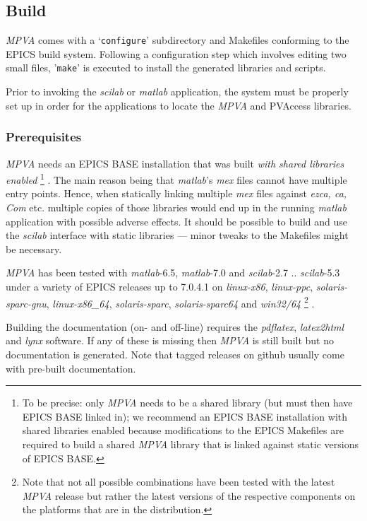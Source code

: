 \documentclass{article}
\newcommand{\sca}{\ita{MPVA}}
\newcommand{\scilab}{\ita{scilab}}
\newcommand{\matlab}{\ita{matlab}}
\newcommand{\windoze}{\ita{win32/64}}
\newcommand{\com}[1]{{\tt #1}}
\newcommand{\ita}[1]{\emph{#1}}
\begin{document}
\subsection{Build}

\sca{} comes with a `\com{configure}' subdirectory and Makefiles conforming to the
EPICS build system. Following a configuration step which involves editing
two small files, '\com{make}' is executed to install the generated libraries
and scripts.

Prior to invoking the \scilab{} or \matlab{} application, the system
must be properly set up in order for the applications to locate the
\sca{} and PVAccess libraries.

\subsubsection{Prerequisites}
\sca{} needs an EPICS BASE installation that was built \ita{with shared
libraries enabled}%
\footnote{
To be precise: only \sca{} needs to be a shared library (but must then have
EPICS BASE linked in); we recommend an EPICS BASE installation with
shared libraries enabled because modifications to the EPICS Makefiles
are required to build a shared \sca{} library that is linked against
static versions of EPICS BASE.}%
.
The main reason being that \matlab's \ita{mex} files cannot
have multiple entry points. Hence, when statically linking multiple \ita{mex}
files against \ita{ezca, ca, Com} etc. multiple copies of those libraries
would end up in the running \matlab{} application with possible adverse
effects. It should be possible to build and use the \scilab{} interface
with static libraries --- minor tweaks to the Makefiles might be necessary.

\sca{} has been tested with \matlab-6.5, \matlab-7.0 and \scilab-2.7 .. \scilab-5.3
under a variety of EPICS releases up to 7.0.4.1 on \ita{linux-x86},
\ita{linux-ppc}, \ita{solaris-sparc-gnu},
\ita{linux-x86\_64}, \ita{solaris-sparc}, \ita{solaris-sparc64}
and \windoze%
\footnote{
Note that not all possible combinations have been tested with the latest \sca{} release
but rather the latest versions of the respective components on the platforms
that are in the distribution.}%
.


Building the documentation (on- and off-line) requires the \ita{pdflatex},
\ita{latex2html} and \ita{lynx} software. If any of these is missing then
\sca{} is still built but no documentation is generated. Note that
tagged releases on github usually come with pre-built documentation.
\end{document}
